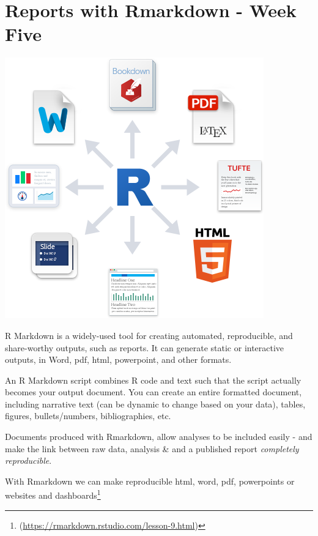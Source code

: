 \documentclass[
]{book}
\begin{document}
\hypertarget{reports-with-rmarkdown---week-five}{%
\chapter{Reports with Rmarkdown - Week Five}\label{reports-with-rmarkdown---week-five}}

\includegraphics[width=1\linewidth]{images/rmarkdownoutputformats}

R Markdown is a widely-used tool for creating automated, reproducible, and share-worthy outputs, such as reports. It can generate static or interactive outputs, in Word, pdf, html, powerpoint, and other formats.

An R Markdown script combines R code and text such that the script actually becomes your output document. You can create an entire formatted document, including narrative text (can be dynamic to change based on your data), tables, figures, bullets/numbers, bibliographies, etc.

Documents produced with Rmarkdown, allow analyses to be included easily - and make the link between raw data, analysis \& and a published report \emph{completely reproducible}.

With Rmarkdown we can make reproducible html, word, pdf, powerpoints or websites and dashboards\footnote{(\url{https://rmarkdown.rstudio.com/lesson-9.html})}
\end{document}
